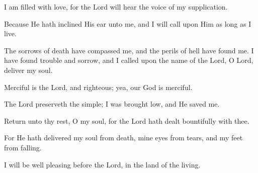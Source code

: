 I am filled with love, for the Lord will hear the voice of my supplication.

Because He hath inclined His ear unto me, and I will call upon Him as long as I live.

The sorrows of death have compassed me, and the perils of hell have found me. I have found trouble and sorrow, and I called upon the name of the Lord, O Lord, deliver my soul.

Merciful is the Lord, and righteous; yea, our God is merciful.

The Lord preserveth the simple; I was brought low, and He saved me.

Return unto thy rest, O my soul, for the Lord hath dealt bountifully with thee.

For He hath delivered my soul from death, mine eyes from tears, and my feet from falling.

I will be well pleasing before the Lord, in the land of the living.
